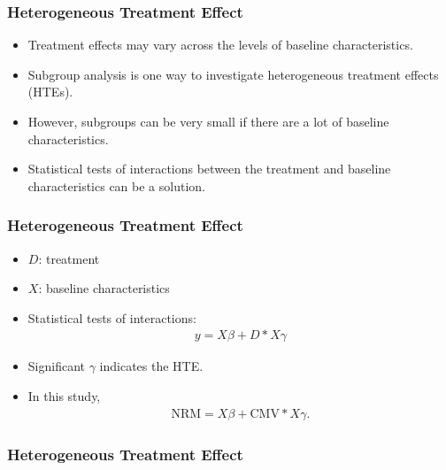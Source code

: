 \documentclass[14pt]{beamer}
\begin{document}
	\begin{frame}
	\frametitle{Heterogeneous Treatment Effect}
	\begin{itemize}
	\item Treatment effects may vary across the levels of baseline characteristics.
	\item Subgroup analysis is one way to investigate heterogeneous treatment effects (HTEs).
	\item However, subgroups can be very small if there are a lot of baseline characteristics.
	\item Statistical tests of interactions between the treatment and baseline characteristics can be a solution.

	\end{itemize}
	\end{frame}

	\begin{frame}
	\frametitle{Heterogeneous Treatment Effect}
	\begin{itemize}
	\item $D$: treatment
	\item $X$: baseline characteristics
	\item Statistical tests of interactions:
	\begin{eqnarray*}
	y = X \beta + D * X \gamma
	\end{eqnarray*}
	\item Significant $\gamma$ indicates the HTE.
	\item In this study,
	\begin{eqnarray*}
	\text{NRM} = X \beta + \text{CMV} * X \gamma.
	\end{eqnarray*}

	\end{itemize}
	\end{frame}

	\begin{frame}
	\frametitle{Heterogeneous Treatment Effect}
	\end{frame}
\end{document}
